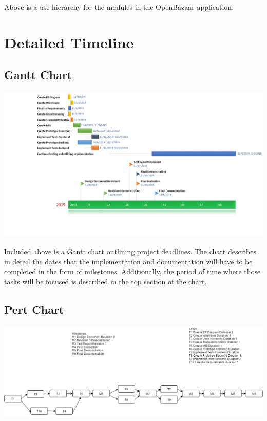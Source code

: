 \documentclass{article}
\begin{document}
Above is a use hierarchy for the modules in the OpenBazaar application.
\section*{Detailed Timeline}

\subsection*{Gantt Chart}
\includegraphics[scale=0.5]{ganttchart}

Included above is a Gantt chart outlining project deadlines. The chart describes in detail the dates that the implementation and documentation will have to be completed in the form of milestones. Additionally, the period of time where those tasks will be focused is described in the top section of the chart.

\subsection*{Pert Chart}
\includegraphics[scale=0.4]{pertchart}
\end{document}
